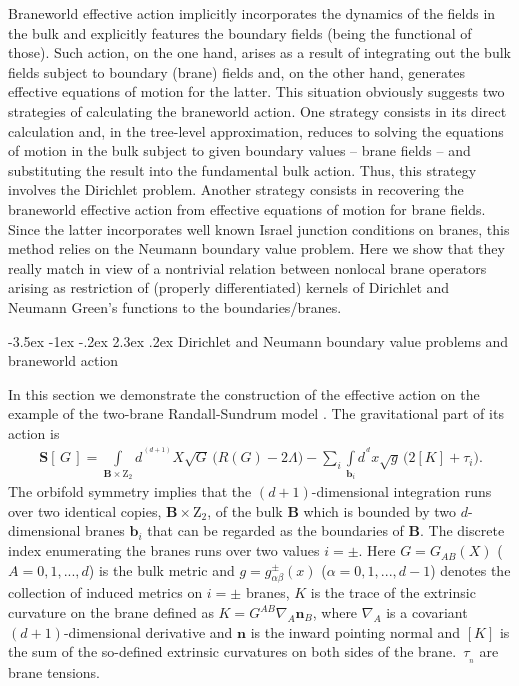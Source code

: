 \documentclass[a4paper,12pt]{article}
\makeatletter
\renewcommand\section{\@startsection {section}{1}{\z@}%
                                   {-3.5ex \@plus -1ex \@minus -.2ex}%
                                   {2.3ex \@plus.2ex}%
                                   {\normalfont\large\bfseries}}
\newcommand{\za}{{\alpha}}   %
\newcommand{\zb}{{\beta}}    %
\newcommand{\ZA}{{A}}    %
\newcommand{\ZB}{{B}}    %
\newcommand{\ddim}{{d}}
\newcommand{\DDim}{{(d\!+\!1)}}
\newcommand{\M}{{\cal M}}
\newcommand{\dM}{{\partial \cal M}}
\newcommand{\dx}{d^{^{\,\ddim}} \!x}
\newcommand{\dX}{d^{^{\,\DDim}} \!X}
\newcommand{\un}{\mathbf n} %
\newcommand{\Bnabla}{\nabla}
\newcommand{\tens}{{\tau}}
\makeatother
\begin{document}
Braneworld effective action implicitly incorporates the dynamics
of the fields in the bulk and explicitly features the boundary
fields (being the functional of those). Such action, on the one
hand, arises as a result of integrating out the bulk fields
subject to boundary (brane) fields and, on the other hand,
generates effective equations of motion for the latter. This
situation obviously suggests two strategies of calculating the
braneworld action. One strategy consists in its direct calculation
and, in the tree-level approximation, reduces to solving the
equations of motion in the bulk subject to given boundary values
-- brane fields -- and substituting the result into the
fundamental bulk action. Thus, this strategy involves the
Dirichlet problem. Another strategy consists in recovering the
braneworld effective action from effective equations of motion for
brane fields. Since the latter incorporates well known Israel
junction conditions on branes, this method relies on
the Neumann boundary value problem. Here we show that they really
match in view of a nontrivial relation between nonlocal brane
operators arising as restriction of (properly differentiated)
kernels of Dirichlet and Neumann Green's functions to the
boundaries/branes.

\section{Dirichlet and Neumann
boundary value problems and braneworld action}
\renewcommand{\M}{\mathbf B}
\renewcommand{\dM}{\mathbf b}
\newcommand{\U}{\mathbf U}

In this section we demonstrate the construction of the effective
action on the example of the two-brane Randall-Sundrum model
\cite{RS}. The gravitational part of its action is
    \begin{eqnarray}
     &&\mathbf{S}[\,G\,]
     =\int\limits_{\M\times\mathrm{Z}_2}\!
     \dX \sqrt{G}\,
     \big(R(G)-2\Lambda\big)-
     \sum_{i}\int\limits_{\dM_i}
     \dx\sqrt{g}\,\big(2[K]
     +\tens_i\big).        \quad\;\, \label{Action}
    \end{eqnarray}
The orbifold symmetry implies that the $\DDim$-dimensional
integration runs over two identical copies, $\M\times\mathrm{Z}_2$,
of the bulk $\M$ which
is bounded by two $\ddim$-dimensional branes $\dM_i$ that can be
regarded as the boundaries of $\M$. The discrete index
enumerating the branes runs over two values $i=\pm$. Here
$G=G_{\ZA\ZB}(X)$ ($\ZA=0,1,...,\ddim$) is the bulk metric and
$g=g^\pm_{\za\zb}(x)$ ($\za=0,1,...,\ddim\!-\!1$) denotes the
collection of induced metrics on $i=\pm$ branes, $K$ is the trace
of the extrinsic curvature on the brane defined as $K=
G^{\ZA\ZB}\nabla_\ZA \un_\ZB$, where $\Bnabla_\ZA$ is a covariant
$\DDim$-dimensional derivative and $\un$ is the inward pointing
normal and $[K]$ is the sum of the so-defined extrinsic curvatures
on both sides of the brane. $\,\tens_{_n}$ are brane tensions.
\end{document}

